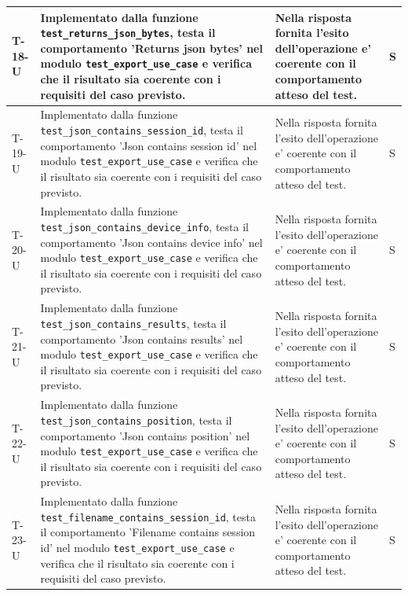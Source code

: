 \documentclass[a4paper,12pt]{article}
\begin{document}
{{\begin{longtable}{|>{\RaggedRight\arraybackslash}p{1.55cm}|>{\RaggedRight\arraybackslash}p{8.0cm}|>{\RaggedRight\arraybackslash}p{4.6cm}|>{\RaggedRight\arraybackslash}p{1.2cm}|}
        \hline
        T-18-U & Implementato dalla funzione \texttt{test\_\allowbreak returns\_\allowbreak json\_\allowbreak bytes}, testa il comportamento 'Returns json bytes' nel modulo \texttt{test\_\allowbreak export\_\allowbreak use\_\allowbreak case} e verifica che il risultato sia coerente con i requisiti del caso previsto. & Nella risposta fornita l'esito dell'operazione e' coerente con il comportamento atteso del test. & S \\
        \hline
        T-19-U & Implementato dalla funzione \texttt{test\_\allowbreak json\_\allowbreak contains\_\allowbreak session\_\allowbreak id}, testa il comportamento 'Json contains session id' nel modulo \texttt{test\_\allowbreak export\_\allowbreak use\_\allowbreak case} e verifica che il risultato sia coerente con i requisiti del caso previsto. & Nella risposta fornita l'esito dell'operazione e' coerente con il comportamento atteso del test. & S \\
        \hline
        T-20-U & Implementato dalla funzione \texttt{test\_\allowbreak json\_\allowbreak contains\_\allowbreak device\_\allowbreak info}, testa il comportamento 'Json contains device info' nel modulo \texttt{test\_\allowbreak export\_\allowbreak use\_\allowbreak case} e verifica che il risultato sia coerente con i requisiti del caso previsto. & Nella risposta fornita l'esito dell'operazione e' coerente con il comportamento atteso del test. & S \\
        \hline
        T-21-U & Implementato dalla funzione \texttt{test\_\allowbreak json\_\allowbreak contains\_\allowbreak results}, testa il comportamento 'Json contains results' nel modulo \texttt{test\_\allowbreak export\_\allowbreak use\_\allowbreak case} e verifica che il risultato sia coerente con i requisiti del caso previsto. & Nella risposta fornita l'esito dell'operazione e' coerente con il comportamento atteso del test. & S \\
        \hline
        T-22-U & Implementato dalla funzione \texttt{test\_\allowbreak json\_\allowbreak contains\_\allowbreak position}, testa il comportamento 'Json contains position' nel modulo \texttt{test\_\allowbreak export\_\allowbreak use\_\allowbreak case} e verifica che il risultato sia coerente con i requisiti del caso previsto. & Nella risposta fornita l'esito dell'operazione e' coerente con il comportamento atteso del test. & S \\
        \hline
        T-23-U & Implementato dalla funzione \texttt{test\_\allowbreak filename\_\allowbreak contains\_\allowbreak session\_\allowbreak id}, testa il comportamento 'Filename contains session id' nel modulo \texttt{test\_\allowbreak export\_\allowbreak use\_\allowbreak case} e verifica che il risultato sia coerente con i requisiti del caso previsto. & Nella risposta fornita l'esito dell'operazione e' coerente con il comportamento atteso del test. & S \\

\end{longtable}}}
\end{document}
